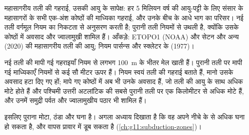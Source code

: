 \begin{omfigure}

{\small महासागरीय तली की गहराई, उसकी आयु के सापेक्ष: हर 5 मिलियन वर्ष की आयु-पट्टी के लिए
संसार के महासागरों के सभी एक-अंश कोष्ठों की माध्यिका गहराई,
और उनके बीच के आधे भाग का परिसर। नई तली
वर्गमूल नियम का निकटता से अनुसरण करती है; पुरानी तली नियमों से उथली है, क्योंकि
उसके कोष्ठों में अवसाद और ज्वालामुखी शामिल हैं। आँकड़े: ETOPO1 (NOAA) और
सेटन और अन्य (2020) की महासागरीय तली की आयु; नियम पार्सन्स और स्क्लेटर के
(1977)।}
\end{omfigure}

नई तली की मापी गई गहराइयाँ नियम से लगभग
\qty{100}{m} के भीतर मेल खाती हैं। पुरानी तली पर मापी गई माध्यिकाएँ नियमों से कई सौ मीटर
ऊपर हैं। नियम स्वयं तली की गहराई बताते हैं, मानो उसके
अवसाद हटा दिए गए हों; मापे गए कोष्ठों में अब भी उनके अवसाद हैं,
जो तली की आयु के साथ अधिक मोटे होते हैं और पश्चिमी उत्तरी अटलांटिक की सबसे पुरानी तली पर
एक किलोमीटर से अधिक मोटे हैं, और उनमें
समुद्री पर्वत और ज्वालामुखीय पठार भी शामिल हैं।

इसलिए पुराना  मोटा, ठंडा और घना है। अगला अध्याय
दिखाता है कि वह अपने नीचे के  से अधिक घना हो सकता है, और
वापस प्रावार में डूब सकता है (\cref{ch:g11:subduction-zones})।

